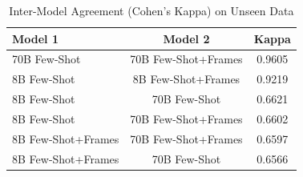 \begin{table}[t]
\centering
\caption{Inter-Model Agreement (Cohen's Kappa) on Unseen Data}
\label{tab:llm_unseen_pairwise_kappa}
\begin{tabular}{lcc}
\toprule
Model 1 & Model 2 & Kappa \\
\midrule
70B Few-Shot & 70B Few-Shot+Frames & 0.9605 \\
8B Few-Shot & 8B Few-Shot+Frames & 0.9219 \\
8B Few-Shot & 70B Few-Shot & 0.6621 \\
8B Few-Shot & 70B Few-Shot+Frames & 0.6602 \\
8B Few-Shot+Frames & 70B Few-Shot+Frames & 0.6597 \\
8B Few-Shot+Frames & 70B Few-Shot & 0.6566 \\
\bottomrule
\end{tabular}
\end{table}
